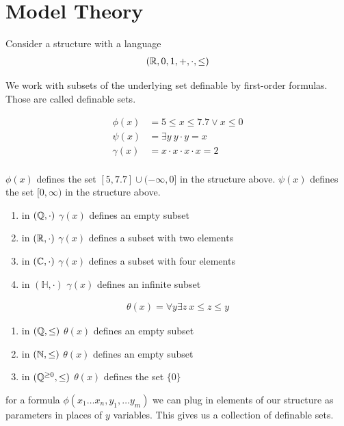 \documentclass{amsart}
\begin{document}
\section{Model Theory}

Consider a structure with a language
\begin{align*}
	(\mathbb{R}, 0, 1, +, \cdot, \leq)
\end{align*}

We work with subsets of the underlying set definable by first-order formulas.
Those are called definable sets.

\begin{align*}
	\phi(x) &= 5 \leq x \leq 7.7 \vee x \leq 0\\
	\psi(x) &= \exists y \ y \cdot y = x \\
	\gamma(x) &= x \cdot x \cdot x \cdot x = 2 \\
\end{align*}

$\phi(x)$ defines the set $[5, 7.7] \cup (-\infty, 0]$ in the structure above.
$\psi(x)$ defines the set $[0, \infty)$ in the structure above.

\begin{enumerate}
	\item in $(\mathbb{Q}, \cdot)$ $\gamma(x)$ defines an empty subset
	\item in $(\mathbb{R}, \cdot)$ $\gamma(x)$ defines a subset with two elements
	\item in $(\mathbb{C}, \cdot)$ $\gamma(x)$ defines a subset with four elements
	\item in $(\mathbb H, \cdot)$ $\gamma(x)$ defines an infinite subset
\end{enumerate}

\begin{align*}
	\theta(x) = \forall y \exists z \ x \leq z \leq y
\end{align*}

\begin{enumerate}
	\item in $(\mathbb{Q}, \leq)$ $\theta(x)$ defines an empty subset
	\item in $(\mathbb{N}, \leq)$ $\theta(x)$ defines an empty subset
	\item in $(\mathbb{Q}^{\geq 0}, \leq)$ $\theta(x)$ defines the set $\{0\}$
\end{enumerate}

\begin{Definition}
	for a formula $\phi(x_1 \ldots x_n, y_1, \ldots y_m)$ we can plug in elements of our structure as parameters in places of $y$ variables. This gives us a collection of definable sets. 
\end{Definition}
\end{document}
